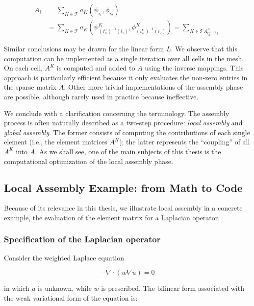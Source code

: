 \begin{equation}
\begin{split}
A_i & = \sum_{K \in \mathcal{T}} a_K (\psi_{i_1},\phi_{i_2}) \\
& = \sum_{K \in \mathcal{T}} a_K(\psi_{(\iota_K^U)^{-1}(i_1)}^K, \phi_{(\iota_K^V)^{-1}(i_2)}^K) = \sum_{K \in \mathcal{T} A_{\iota_K^{-1}(i)}^K}
\end{split}
\end{equation} 

Similar conclusions may be drawn for the linear form $L$. We observe that this computation can be implemented as a single iteration over all cells in the mesh. On each cell, $A^K$ is computed and added to $A$ using the inverse mappings. This approach is particularly efficient because it only evaluates the non-zero entries in the sparse matrix $A$. Other more trivial implementations of the assembly phase are possible, although rarely used in practice because ineffective. 

We conclude with a clarification concerning the terminology. The assembly process is often naturally described as a two-step procedure: {\em local assembly}  and {\em global assembly}. The former consists of computing the contributions of each single element (i.e., the element matrices $A^K$); the latter represents the ``coupling'' of all $A^K$ into $A$. As we shall see, one of the main subjects of this thesis is the computational optimization of the local assembly phase.

\subsection{Local Assembly Example: from Math to Code}
\label{sec:bkg:math-to-code}
Because of its relevance in this thesis, we illustrate local assembly in a concrete example, the evaluation of the element matrix for a Laplacian operator. 

\subsubsection{Specification of the Laplacian operator}
Consider the weighted Laplace equation

\begin{equation}
- \nabla \cdot (w \nabla u) = 0
\end{equation}

in which $u$ is unknown, while $w$ is prescribed. The bilinear form associated with the weak variational form of the equation is:

